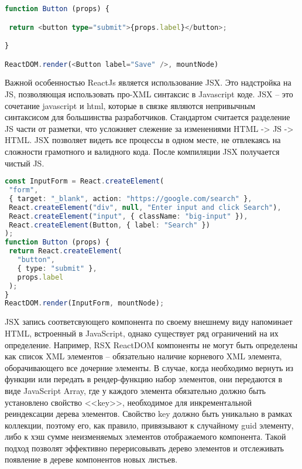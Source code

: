 \begin{lstlisting}[language=TypeScript, label=lst:domain:typescript]
function Button (props) {

 return <button type="submit">{props.label}</button>;

}

ReactDOM.render(<Button label="Save" />, mountNode)
\end{lstlisting}

Важной особенностью ReactJs является использование JSX. Это надстройка на JS, позволяющая использовать про-XML синтаксис в 
Javascript коде. JSX – это сочетание javascript и html, которые в связке являются непривычным синтаксисом для большинства разработчиков. 
Стандартом считается разделение JS части от разметки, что усложняет слежение за изменениями HTML -> JS -> HTML. JSX позволяет видеть все процессы 
в одном месте, не отвлекаясь на сложности грамотного и валидного кода. После компиляции JSX получается чистый JS.

\begin{lstlisting}[language=TypeScript, label=lst:domain:typescript]
const InputForm = React.createElement(
 "form",
 { target: "_blank", action: "https://google.com/search" },
 React.createElement("div", null, "Enter input and click Search"),
 React.createElement("input", { className: "big-input" }),
 React.createElement(Button, { label: "Search" })
);
function Button (props) {
 return React.createElement(
   "button",
   { type: "submit" },
   props.label
 );
}
ReactDOM.render(InputForm, mountNode);
\end{lstlisting}

JSX запись соответсвующего компонента по своему внешнему виду напоминает HTML, встроенный в JavaScript, однако существует ряд ограничений на их определение.
Например, RSX ReactDOM компоненты не могут быть определены как список XML элементов -- обязательно наличие корневого XML элемента, оборачивающего все дочерние элементы.
В случае, когда необходимо вернуть из функции или передать в рендер-функцию набор элементов, они передаются в виде JavaScript Array, где у каждого элемента обязательно должно
быть установлено свойство <<key>>, необходимое для инкрементальной реиндексации дерева элементов. Свойство key должно быть уникально в рамках коллекции, поэтому его, как правило,
привязывают к случайному guid элементу, либо к хэш сумме неизменяемых элементов отображаемого компонента. Такой подход позволят эффективно перерисовывать дерево элементов
и отслеживать появление в дереве компонентов новых листьев.

